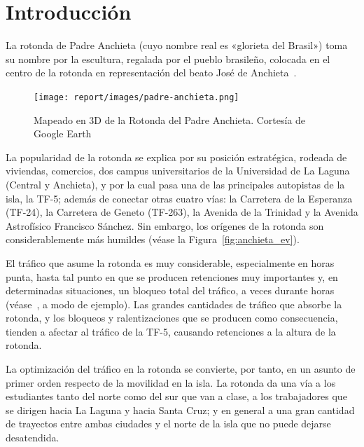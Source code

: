 \chapter{Introducción}
\label{cap:1-intro}

La rotonda de Padre Anchieta (cuyo nombre real es «glorieta del Brasil») toma su nombre por la escultura, regalada por el pueblo brasileño, colocada en el centro de la rotonda en representación del beato José de Anchieta~\cite{gallo_glorieta_2013}.

\begin{figure}[H]
    \centering
    \texttt{[image: report/images/padre-anchieta.png]}
    \caption[Mapeado en 3D de la Rotonda del Padre Anchieta.]{Mapeado en 3D de la Rotonda del Padre Anchieta. Cortesía de Google Earth\protect\footnotemark}
    \label{fig:padre_anchieta_3d}
\end{figure}


La popularidad de la rotonda se explica por su posición estratégica, rodeada de viviendas, comercios, dos campus universitarios de la Universidad de La Laguna (Central y Anchieta), y por la cual pasa una de las principales autopistas de la isla, la TF-5; además de conectar otras cuatro vías: la Carretera de la Esperanza (TF-24), la Carretera de Geneto (TF-263), la Avenida de la Trinidad y la Avenida Astrofísico Francisco Sánchez. Sin embargo, los orígenes de la rotonda son considerablemente más humildes (véase la Figura~\ref{fig:anchieta_ev}).

El tráfico que asume la rotonda es muy considerable, especialmente en horas punta, hasta tal punto en que se producen retenciones muy importantes y, en determinadas situaciones, un bloqueo total del tráfico, a veces durante horas (véase~\cite{gulesserian_vuelven_2018}, a modo de ejemplo). Las grandes cantidades de tráfico que absorbe la rotonda, y los bloqueos y ralentizaciones que se producen como consecuencia, tienden a afectar al tráfico de la TF-5, causando retenciones a la altura de la rotonda.

La optimización del tráfico en la rotonda se convierte, por tanto, en un asunto de primer orden respecto de la movilidad en la isla. La rotonda da una vía a los estudiantes tanto del norte como del sur que van a clase, a los trabajadores que se dirigen hacia La Laguna y hacia Santa Cruz; y en general a una gran cantidad de trayectos entre ambas ciudades y el norte de la isla que no puede dejarse desatendida.

